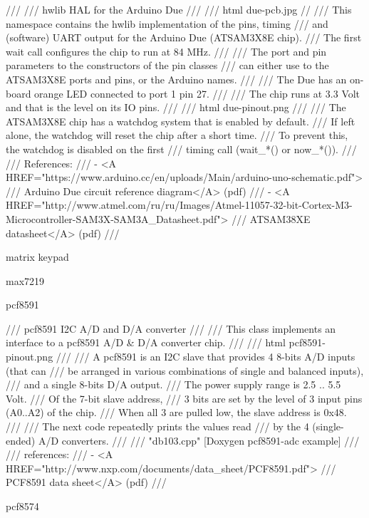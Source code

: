 /// \brief
/// hwlib HAL for the Arduino Due
///
/// \image html due-pcb.jpg
//
/// This namespace contains the hwlib implementation of the pins, timing
/// and (software) UART output for the Arduino Due (ATSAM3X8E chip).
/// The first wait call configures the chip to run at 84 MHz.
///
/// The port and pin parameters to the constructors of the pin classes
/// can either use to the ATSAM3X8E ports and pins, or the Arduino names.
///
/// The Due has an on-board orange LED connected to port 1 pin 27.
///
/// The chip runs at 3.3 Volt and that is the level on its IO pins.
///
/// \image html due-pinout.png
///
/// The ATSAM3X8E chip has a watchdog system that is enabled by default.
/// If left alone, the watchdog will reset the chip after a short time.
/// To prevent this, the watchdog is disabled on the first
/// timing call (wait_*() or now_*()).
///
/// References:
///    - <A HREF="https://www.arduino.cc/en/uploads/Main/arduino-uno-schematic.pdf">
///       Arduino Due circuit reference diagram</A> (pdf)
///    - <A HREF="http://www.atmel.com/ru/ru/Images/Atmel-11057-32-bit-Cortex-M3-Microcontroller-SAM3X-SAM3A_Datasheet.pdf">
///       ATSAM38XE datasheet</A> (pdf)
///


matrix keypad

max7219


pcf8591

/// pcf8591 I2C A/D and D/A converter
///
/// This class implements an interface to a pcf8591 A/D & D/A converter chip.
///
/// \image html pcf8591-pinout.png
///
/// A pcf8591 is an I2C slave that provides 4 8-bits A/D inputs (that can
/// be arranged in various combinations of single and balanced inputs),
/// and a single 8-bits D/A output.
/// The power supply range is 2.5 .. 5.5 Volt.
/// Of the 7-bit slave address,
/// 3 bits are set by the level of 3 input pins (A0..A2) of the chip.
/// When all 3 are pulled low, the slave address is 0x48.
///
/// The next code repeatedly prints the values read
/// by the 4 (single-ended) A/D converters.
///
/// \snippet "db103\main.cpp" [Doxygen pcf8591-adc example]
///
/// references:
///    - <A HREF="http://www.nxp.com/documents/data_sheet/PCF8591.pdf">
///       PCF8591 data sheet</A> (pdf)
///

pcf8574

